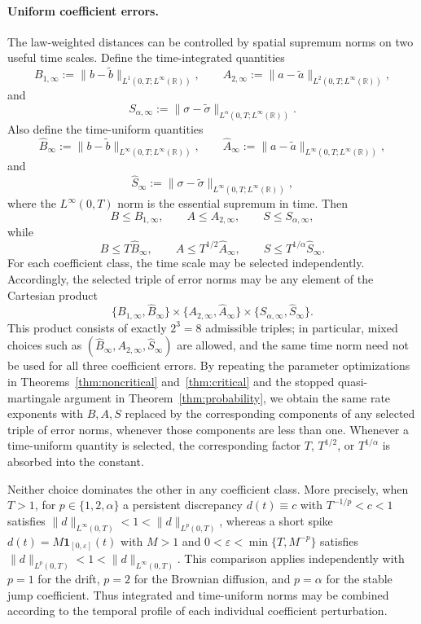 \documentclass[10pt,a4paper]{amsart}
\newcommand{\R}{\mathbb{R}}
\newcommand{\1}{\mathbf{1}}
\newcommand{\wt}{\tilde}
\begin{document}
\paragraph{Uniform coefficient errors.}
The law-weighted distances can be controlled by spatial supremum norms on two useful time scales.
Define the time-integrated quantities
\[
B_{1,\infty}
:=\|b-\wt b\|_{L^1(0,T;L^\infty(\R))},
\qquad
A_{2,\infty}
:=\|a-\wt a\|_{L^2(0,T;L^\infty(\R))},
\]
and
\[
S_{\alpha,\infty}
:=\|\sigma-\wt\sigma\|_{L^\alpha(0,T;L^\infty(\R))}.
\]
Also define the time-uniform quantities
\[
\hat B_\infty
:=\|b-\wt b\|_{L^\infty(0,T;L^\infty(\R))},
\qquad
\hat A_\infty
:=\|a-\wt a\|_{L^\infty(0,T;L^\infty(\R))},
\]
and
\[
\hat S_\infty
:=\|\sigma-\wt\sigma\|_{L^\infty(0,T;L^\infty(\R))},
\]
where the $L^\infty(0,T)$ norm is the essential supremum in time.
Then
\[
B\le B_{1,\infty},\qquad
A\le A_{2,\infty},\qquad
S\le S_{\alpha,\infty},
\]
while
\[
B\le T\hat B_\infty,\qquad
A\le T^{1/2}\hat A_\infty,\qquad
S\le T^{1/\alpha}\hat S_\infty.
\]
For each coefficient class, the time scale may be selected independently.
Accordingly, the selected triple of error norms may be any element of the Cartesian product
\[
\{B_{1,\infty},\hat B_\infty\}
\times
\{A_{2,\infty},\hat A_\infty\}
\times
\{S_{\alpha,\infty},\hat S_\infty\}.
\]
This product consists of exactly $2^3=8$ admissible triples; in particular, mixed choices such as $(\hat B_\infty,A_{2,\infty},\hat S_\infty)$ are allowed, and the same time norm need not be used for all three coefficient errors.
By repeating the parameter optimizations in Theorems~\ref{thm:noncritical} and~\ref{thm:critical} and the stopped quasi-martingale argument in Theorem~\ref{thm:probability}, we obtain the same rate exponents with $B,A,S$ replaced by the corresponding components of any selected triple of error norms, whenever those components are less than one.
Whenever a time-uniform quantity is selected, the corresponding factor $T$, $T^{1/2}$, or $T^{1/\alpha}$ is absorbed into the constant.

Neither choice dominates the other in any coefficient class.
More precisely, when $T>1$, for $p\in\{1,2,\alpha\}$ a persistent discrepancy $d(t)\equiv c$ with $T^{-1/p}<c<1$ satisfies $\|d\|_{L^\infty(0,T)}<1<\|d\|_{L^p(0,T)}$, whereas a short spike $d(t)=M\1_{[0,\varepsilon]}(t)$ with $M>1$ and $0<\varepsilon<\min\{T,M^{-p}\}$ satisfies $\|d\|_{L^p(0,T)}<1<\|d\|_{L^\infty(0,T)}$.
This comparison applies independently with $p=1$ for the drift, $p=2$ for the Brownian diffusion, and $p=\alpha$ for the stable jump coefficient.
Thus integrated and time-uniform norms may be combined according to the temporal profile of each individual coefficient perturbation.
\end{document}
